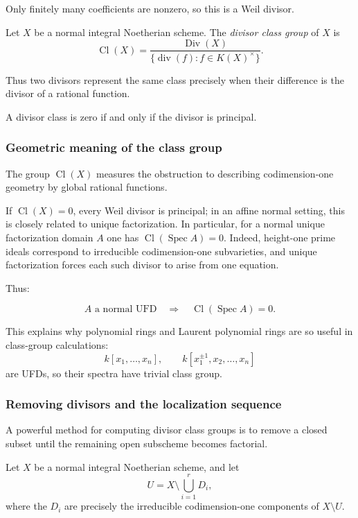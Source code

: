 Only finitely many coefficients are nonzero, so this is a Weil divisor.

\begin{definition}
	Let \(X\) be a normal integral Noetherian scheme. The \emph{divisor class group} of \(X\) is
	\[
	\operatorname{Cl}(X)
	=
	\frac{\operatorname{Div}(X)}
	{\{\operatorname{div}(f):f\in K(X)^\times\}}.
	\]
\end{definition}

Thus two divisors represent the same class precisely when their difference is the divisor of a rational function.

A divisor class is zero if and only if the divisor is principal.

\subsubsection{Geometric meaning of the class group}

The group \(\operatorname{Cl}(X)\) measures the obstruction to describing codimension-one geometry by global rational functions.

If \(\operatorname{Cl}(X)=0\), every Weil divisor is principal; in
an affine normal setting, this is closely related to unique
factorization. In particular, for a normal unique factorization domain
\(A\) one has \(\operatorname{Cl}(\operatorname{Spec}A)=0\). Indeed, height-one prime ideals correspond to irreducible codimension-one subvarieties, and unique factorization forces each such divisor to arise from one equation.

Thus:

\[
\boxed{
	A\text{ a normal UFD}
	\quad\Longrightarrow\quad
	\operatorname{Cl}(\operatorname{Spec} A)=0.
}
\]

This explains why polynomial rings and Laurent polynomial rings are so useful in class-group calculations:
\[
k[x_1,\dots,x_n],
\qquad
k[x_1^{\pm 1},x_2,\dots,x_n]
\]
are UFDs, so their spectra have trivial class group.

\subsubsection{Removing divisors and the localization sequence}

A powerful method for computing divisor class groups is to remove a closed subset until the remaining open subscheme becomes factorial.

Let \(X\) be a normal integral Noetherian scheme, and let
\[
U=X\setminus \bigcup_{i=1}^{r}D_i,
\]
where the \(D_i\) are precisely the irreducible codimension-one components of \(X\setminus U\).

